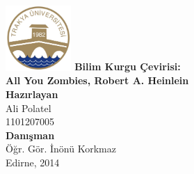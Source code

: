 
\thispagestyle{empty}
\begin{titlingpage}
  \centering
  \institution\\ %
  \department\\ %
  \langdepartment\\ %
  \project\\[1cm]

  \shorthandoff{=}
  \includegraphics[width=2.5cm]{trakya}  %
  \shorthandon{=}
  {\large\bfseries Bilim Kurgu Çevirisi:\\ All You Zombies, Robert A. Heinlein}\\[2cm]
  \textbf{Hazırlayan}\\
  Ali Polatel\\
  1101207005\\
  \textbf{Danışman}\\
  Öğr. Gör. İnönü Korkmaz\\
  \vfill
  Edirne, 2014
\end{titlingpage}
